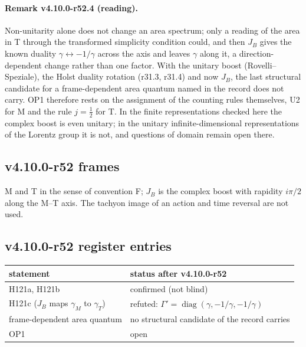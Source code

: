 \paragraph{Remark v4.10.0-r52.4 (reading).}
Non-unitarity alone does not change an area spectrum; only a reading of the area in T through the transformed simplicity condition could, and then
\(J_B\) gives the known duality \(\gamma\leftrightarrow-1/\gamma\) across the axis and leaves \(\gamma\) along it, a direction-dependent change rather than one factor.  With the unitary boost
(Rovelli--Speziale), the Holst duality rotation (r31.3, r31.4) and now \(J_B\), the last structural candidate for a frame-dependent area quantum named in
the record does not carry.  OP1 therefore rests on the assignment of the counting rules themselves, U2 for M and the rule \(j=\tfrac12\) for T.  In the
finite representations checked here the complex boost is even unitary; in the unitary infinite-dimensional representations of the Lorentz group it
is not, and questions of domain remain open there.

\subsection*{v4.10.0-r52 frames}
\label{subsec:v4100-r52-frames}

M and T in the sense of convention F; \(J_B\) is the complex boost with rapidity \(i\pi/2\) along the M--T axis.  The tachyon image of an action and time reversal
are not used.

\subsection*{v4.10.0-r52 register entries}
\label{subsec:v4100-r52-register}

\begin{center}
\small
\begin{tabular}{@{}>{\raggedright\arraybackslash}p{}>{\raggedright\arraybackslash}p{}@{}}
\toprule
statement & status after v4.10.0-r52\\
\midrule
H121a, H121b & confirmed (not blind)\\
H121c (\(J_B\) maps \(\gamma_M\) to \(\gamma_T\)) & refuted: \(\Gamma'=\operatorname{diag}(\gamma,-1/\gamma,-1/\gamma)\)\\
frame-dependent area quantum & no structural candidate of the record carries\\
OP1 & open\\
\bottomrule
\end{tabular}
\end{center}

